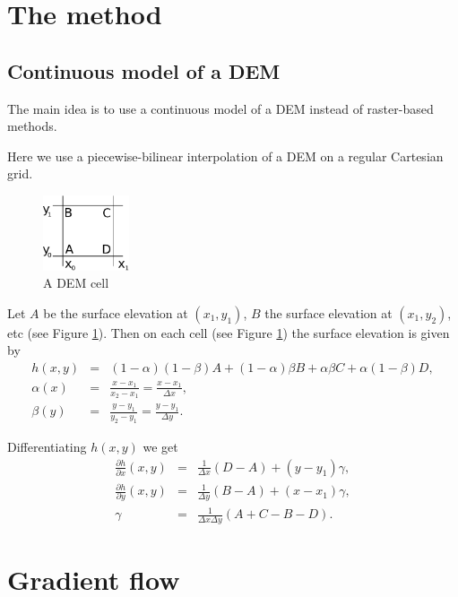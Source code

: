 \documentclass{amsart}
\begin{document}
\section{The method}
\label{sec:method}

\subsection{Continuous model of a DEM}
\label{sec:continuous-model-dem}

The main idea is to use a continuous model of a DEM instead of raster-based methods.

Here we use a piecewise-bilinear interpolation of a DEM on a regular Cartesian grid.

\begin{figure}[h]
  \centering
  \includegraphics[width=1in]{cell.pdf}
  \caption{A DEM cell}
  \label{fig:cell}
\end{figure}

Let $A$ be the surface elevation at $(x_{1},y_{1})$, $B$ the surface elevation
at $(x_{1}, y_{2})$, etc (see Figure \ref{fig:cell}). Then on each cell (see Figure
\ref{fig:cell}) the surface elevation is given by
\begin{eqnarray}
  \label{eq:1}
  h(x,y) &=& (1-\alpha)(1-\beta)A + (1-\alpha)\beta B + \alpha\beta C +
  \alpha(1-\beta)D,\\
  \alpha(x) &=& \frac{x-x_{1}}{x_{2}-x_{1}} = \frac{x-x_{1}}{\Delta x},\\
  \beta(y) &=& \frac{y-y_{1}}{y_{2}-y_{1}} = \frac{y-y_{1}}{\Delta y}.
\end{eqnarray}

Differentiating $h(x,y)$ we get
\begin{eqnarray}
  \label{eq:2}
  \frac{\partial h}{\partial x}(x,y) &=& \frac{1}{\Delta x}(D-A) + (y-y_{1})
  \gamma,\\
  \frac{\partial h}{\partial y}(x,y) &=& \frac{1}{\Delta y}(B-A) + (x-x_{1})
  \gamma,\\
  \gamma &=& \frac{1}{\Delta x \Delta y}(A + C - B - D).
\end{eqnarray}

\section{Gradient flow}
\label{sec:gradient-flow}
\end{document}
